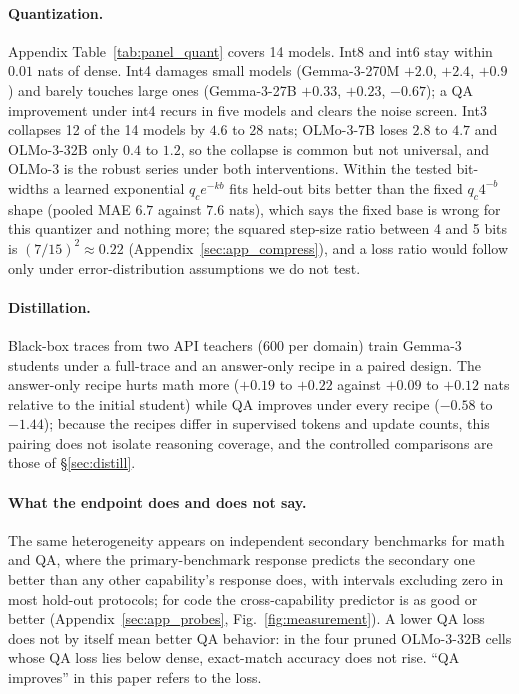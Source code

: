 \paragraph{Quantization.} Appendix Table~\ref{tab:panel_quant} covers
14 models. Int8 and int6 stay within $0.01$ nats of dense. Int4
damages small models (Gemma-3-270M $+2.0$, $+2.4$, $+0.9$) and barely
touches large ones (Gemma-3-27B $+0.33$, $+0.23$, $-0.67$); a QA
improvement under int4 recurs in five models and clears the noise
screen. Int3 collapses 12 of the 14 models by $4.6$ to $28$ nats;
OLMo-3-7B loses $2.8$ to $4.7$ and OLMo-3-32B only $0.4$ to $1.2$, so
the collapse is common but not universal, and OLMo-3 is the robust
series under both interventions. Within the tested bit-widths a learned
exponential $q_c e^{-kb}$ fits held-out bits better than the fixed
$q_c4^{-b}$ shape (pooled MAE $6.7$ against $7.6$ nats), which says the
fixed base is wrong for this quantizer and nothing more; the squared
step-size ratio between 4 and 5 bits is $(7/15)^2\approx0.22$
(Appendix~\ref{sec:app_compress}), and a loss ratio would follow only
under error-distribution assumptions we do not test.

\paragraph{Distillation.} Black-box traces from two API teachers (600
per domain) train Gemma-3 students under a full-trace and an
answer-only recipe in a paired design. The answer-only recipe hurts
math more ($+0.19$ to $+0.22$ against $+0.09$ to $+0.12$ nats relative
to the initial student) while QA improves under every recipe ($-0.58$
to $-1.44$); because the recipes differ in supervised tokens and update
counts, this pairing does not isolate reasoning coverage, and the
controlled comparisons are those of \S\ref{sec:distill}.

\paragraph{What the endpoint does and does not say.} The same
heterogeneity appears on independent secondary benchmarks for math and
QA, where the primary-benchmark response predicts the secondary one
better than any other capability's response does, with intervals
excluding zero in most hold-out protocols; for code the
cross-capability predictor is as good or better
(Appendix~\ref{sec:app_probes}, Fig.~\ref{fig:measurement}). A lower
QA loss does not by itself mean better QA behavior: in the four pruned
OLMo-3-32B cells whose QA loss lies below dense, exact-match accuracy
does not rise. ``QA improves'' in this paper refers to the loss.

